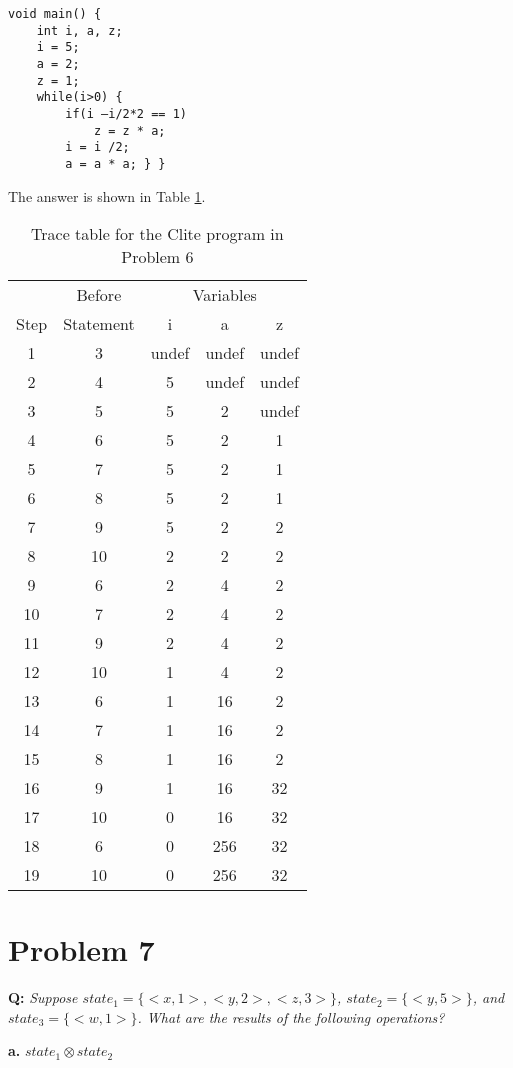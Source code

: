 \documentclass{article}
\begin{document}
\begin{lstlisting}
void main() {
    int i, a, z;
    i = 5;
    a = 2;
    z = 1;
    while(i>0) {
        if(i –i/2*2 == 1)
            z = z * a;
        i = i /2;
        a = a * a; } }
\end{lstlisting}

The answer is shown in Table \ref{t:tracetable}.

\begin{table}[hp]
\centering
\begin{tabular}{ccccc}
\toprule
 & Before & \multicolumn{3}{c}{Variables} \\
\cline{3-5}
Step & Statement & i & a & z \\
\midrule
1 & 3 & undef & undef & undef \\
2 & 4 & 5 & undef & undef \\
3 & 5 & 5 & 2 & undef \\
4 & 6 & 5 & 2 & 1 \\
5 & 7 & 5 & 2 & 1 \\
6 & 8 & 5 & 2 & 1 \\
7 & 9 & 5 & 2 & 2 \\
8 & 10 & 2 & 2 & 2 \\
9 & 6 & 2 & 4 & 2 \\
10 & 7 & 2 & 4 & 2 \\
11 & 9 & 2 & 4 & 2 \\
12 & 10 & 1 & 4 & 2 \\
13 & 6 & 1 & 16 & 2 \\
14 & 7 & 1 & 16 & 2 \\
15 & 8 & 1 & 16 & 2 \\
16 & 9 & 1 & 16 & 32 \\
17 & 10 & 0 & 16 & 32 \\
18 & 6 & 0 & 256 & 32 \\
19 & 10 & 0 & 256 & 32 \\
\bottomrule
\end{tabular}
\caption{Trace table for the Clite program in Problem 6}
\label{t:tracetable}
\end{table}

\section*{Problem 7}

\textbf{Q:} \textit{Suppose $state_1 = \{<x, 1>, <y, 2>, <z, 3>\}$, $state_2 = \{<y, 5>\}$, and $state_3 = \{<w, 1>\}$. What are the results of the following operations?}

\textbf{a.} \textit{$state_1 \otimes state_2$}
\end{document}

